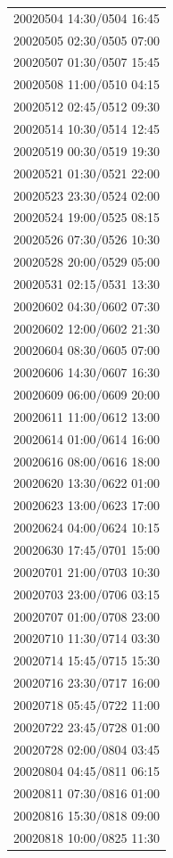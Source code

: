 \documentclass[linenumbers,draft]{agujournal}
\begin{document}
\begin{center}
\begin{longtable}{c}
20020504 14:30/0504 16:45 \\
20020505 02:30/0505 07:00 \\
20020507 01:30/0507 15:45 \\
20020508 11:00/0510 04:15 \\
20020512 02:45/0512 09:30 \\
20020514 10:30/0514 12:45 \\
20020519 00:30/0519 19:30 \\
20020521 01:30/0521 22:00 \\
20020523 23:30/0524 02:00 \\
20020524 19:00/0525 08:15 \\
20020526 07:30/0526 10:30 \\
20020528 20:00/0529 05:00 \\
20020531 02:15/0531 13:30 \\
20020602 04:30/0602 07:30 \\
20020602 12:00/0602 21:30 \\
20020604 08:30/0605 07:00 \\
20020606 14:30/0607 16:30 \\
20020609 06:00/0609 20:00 \\
20020611 11:00/0612 13:00 \\
20020614 01:00/0614 16:00 \\
20020616 08:00/0616 18:00 \\
20020620 13:30/0622 01:00 \\
20020623 13:00/0623 17:00 \\
20020624 04:00/0624 10:15 \\
20020630 17:45/0701 15:00 \\
20020701 21:00/0703 10:30 \\
20020703 23:00/0706 03:15 \\
20020707 01:00/0708 23:00 \\
20020710 11:30/0714 03:30 \\
20020714 15:45/0715 15:30 \\
20020716 23:30/0717 16:00 \\
20020718 05:45/0722 11:00 \\
20020722 23:45/0728 01:00 \\ 
20020728 02:00/0804 03:45 \\ 
20020804 04:45/0811 06:15 \\ 
20020811 07:30/0816 01:00 \\ 
20020816 15:30/0818 09:00 \\
20020818 10:00/0825 11:30 \\ 

\end{longtable}
\end{center}
\end{document}
